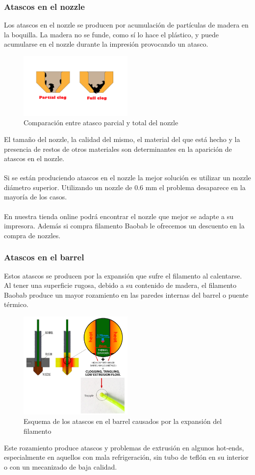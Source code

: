 \documentclass[11pt,a4paper]{article}
\begin{document}
		\subsubsection{Atascos en el nozzle}
Los atascos en el nozzle se producen por acumulación de partículas de madera en la boquilla. La madera no se funde, como sí lo hace el plástico, y puede acumularse en el nozzle durante la impresión provocando un atasco.\begin{figure}[H]
\centering
\includegraphics[width=0.5\textwidth,cfbox=azul_marcos 4pt 0pt]{FOTOS/NOZZLE_CLOG}
\caption*{Comparación entre atasco parcial y total del nozzle}
\end{figure}
El tamaño del nozzle, la calidad del mismo, el material del que está hecho y la presencia de restos de otros materiales son determinantes en la aparición de atascos en el nozzle.\\\\
Si se están produciendo atascos en el nozzle la mejor solución es utilizar un nozzle diámetro superior. Utilizando un nozzle de 0.6 mm el problema desaparece en la mayoría de los casos.\\\\
En nuestra tienda online podrá encontrar el nozzle que mejor se adapte a su impresora. Además si compra filamento Baobab le ofrecemos un descuento en la compra de nozzles.		\subsubsection{Atascos en el barrel}
Estos atascos se producen por la expansión que sufre el filamento al calentarse. Al tener una superficie rugosa, debido a su contenido de madera, el filamento Baobab produce un mayor rozamiento en las paredes internas del barrel o puente térmico.\begin{figure}[H]
\centering
\includegraphics[width=0.5\textwidth,cfbox=azul_marcos 4pt 0pt]{FOTOS/EXPANSION}
\caption*{Esquema de los atascos en el barrel causados por la expansión del filamento}
\end{figure}
Este rozamiento produce atascos y problemas de extrusión en algunos hot-ends, especialmente en aquellos con mala refrigeración, sin tubo de teflón en su interior o con un mecanizado de baja calidad.%
\end{document}
